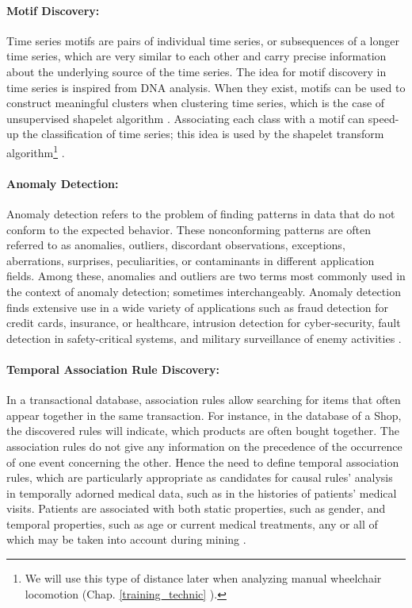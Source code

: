 \paragraph{Motif Discovery:}
Time series motifs are pairs of individual time series, or subsequences of a longer time series, which are very similar to each other and carry precise information about the underlying source of the time series. The idea for motif discovery in time series is inspired from DNA analysis. When they exist, motifs can be used to construct meaningful clusters when clustering time series, which is the case of unsupervised shapelet algorithm \cite{ulanova2015scalable}. Associating each class with a motif can speed-up the classification of time series; this idea is used by the shapelet transform algorithm\footnote{We will use this type of distance later when analyzing manual wheelchair locomotion (Chap. \ref{training_technic} ).} \cite{lines2012shapelet}.

\paragraph{Anomaly Detection:}
Anomaly detection refers to the problem of finding patterns in data that do not conform to the expected behavior. These nonconforming patterns are often referred to as anomalies, outliers, discordant observations, exceptions, aberrations, surprises, peculiarities, or contaminants in different application fields. Among these, anomalies and outliers are two terms  most commonly used in the context of anomaly detection; sometimes interchangeably. Anomaly detection finds extensive use in a wide variety of applications such as fraud detection for credit cards, insurance, or healthcare, intrusion detection for cyber-security, fault detection in safety-critical systems, and military surveillance of enemy activities \cite{chandola2009anomaly}.

\paragraph{Temporal Association Rule Discovery:}
In a transactional database, association rules allow searching for items that often appear together in the same transaction. For instance, in the database of a Shop, the discovered rules will indicate, which products are often bought together. The association rules do not give any information on the precedence of the occurrence of one event concerning the other. Hence the need to define temporal association rules,  which are particularly appropriate as candidates for causal rules' analysis in temporally adorned medical data, such as in the histories of patients' medical visits. Patients are associated with both static properties, such as gender, and temporal properties, such as age or current medical treatments, any or all of which may be taken into account during mining \cite{Vasimalla2017}.

